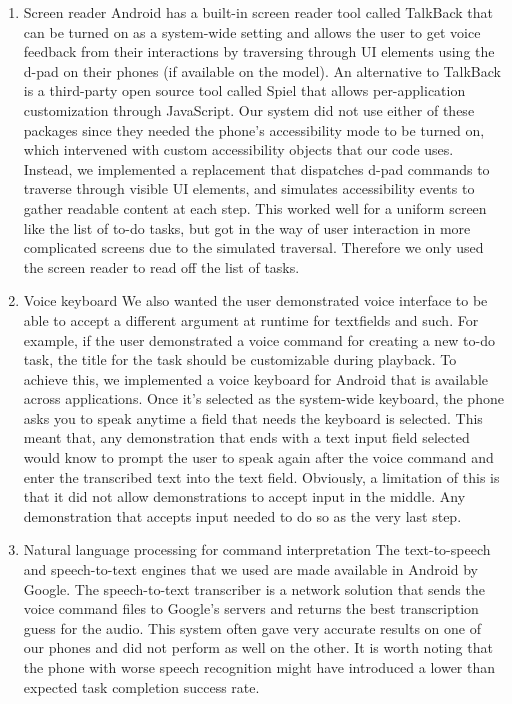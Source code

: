 \documentclass[letterpaper]{article}
\begin{document}
\begin{enumerate}
\item Screen reader
Android has a built-in screen reader tool called TalkBack that can be turned on as a system-wide setting and allows the user to get 
voice feedback from their interactions by traversing through UI elements using the d-pad on their phones (if available on the model). 
An alternative to TalkBack is a third-party open source tool called Spiel that allows per-application customization through JavaScript. 
Our system did not use either of these packages since they needed the phone's accessibility mode to be turned on, which intervened with 
custom accessibility objects that our code uses. Instead, we implemented a replacement that dispatches d-pad commands to traverse 
through visible UI elements, and simulates accessibility events to gather readable content at each step. This worked well for a uniform 
screen like the list of to-do tasks, but got in the way of user interaction in more complicated screens due to the simulated traversal. 
Therefore we only used the screen reader to read off the list of tasks.

\item Voice keyboard
We also wanted the user demonstrated voice interface to be able to accept a different argument at runtime for textfields and such. For 
example, if the user demonstrated a voice command for creating a new to-do task, the title for the task should be customizable during
playback. To achieve this, we implemented a voice keyboard for Android that is available across applications. 
Once it's selected as the system-wide keyboard, the phone asks you to speak anytime a field that needs the keyboard is selected. 
This meant that, any demonstration that ends with a text input field selected would know to prompt the user to speak again after 
the voice command and enter the transcribed text into the text field. Obviously, a limitation of this is that it did not allow 
demonstrations to accept input in the middle. Any demonstration that accepts input needed to do so as the very last step.

\item Natural language processing for command interpretation
The text-to-speech and speech-to-text engines that we used are made available in Android by Google. The speech-to-text transcriber 
is a network solution that sends the voice command files to Google's servers and returns the best transcription guess for the 
audio. This system often gave very accurate results on one of our phones and did not perform as well on the other. It is worth noting 
that the phone with worse speech recognition might have introduced a lower than expected task completion success rate.  

\end{enumerate}
\end{document}
